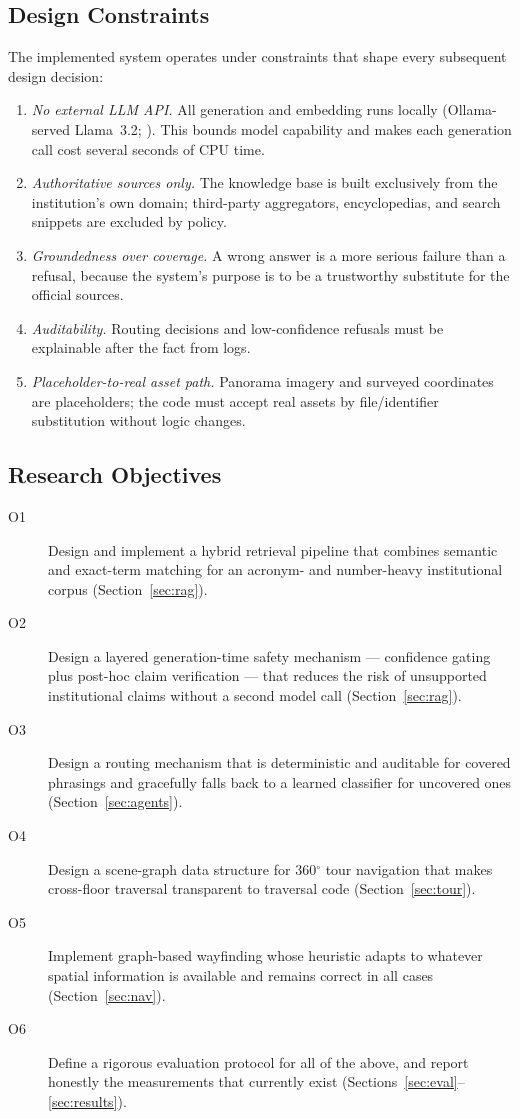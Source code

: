 \subsection{Design Constraints}
The implemented system operates under constraints that shape every
subsequent design decision:

\begin{enumerate}
\item \emph{No external LLM API.} All generation and embedding runs locally
(Ollama-served Llama~3.2; ). This bounds model
capability and makes each generation call cost several seconds of CPU time.
\item \emph{Authoritative sources only.} The knowledge base is built
exclusively from the institution's own domain; third-party aggregators,
encyclopedias, and search snippets are excluded by policy.
\item \emph{Groundedness over coverage.} A wrong answer is a more serious
failure than a refusal, because the system's purpose is to be a trustworthy
substitute for the official sources.
\item \emph{Auditability.} Routing decisions and low-confidence refusals
must be explainable after the fact from logs.
\item \emph{Placeholder-to-real asset path.} Panorama imagery and surveyed
coordinates are placeholders; the code must accept real assets by
file/identifier substitution without logic changes.
\end{enumerate}

\subsection{Research Objectives}
\begin{description}
\item[O1] Design and implement a hybrid retrieval pipeline that combines
semantic and exact-term matching for an acronym- and number-heavy
institutional corpus (Section~\ref{sec:rag}).
\item[O2] Design a layered generation-time safety mechanism --- confidence
gating plus post-hoc claim verification --- that reduces the risk of
unsupported institutional claims without a second model call
(Section~\ref{sec:rag}).
\item[O3] Design a routing mechanism that is deterministic and auditable
for covered phrasings and gracefully falls back to a learned classifier for
uncovered ones (Section~\ref{sec:agents}).
\item[O4] Design a scene-graph data structure for 360$^{\circ}$ tour
navigation that makes cross-floor traversal transparent to traversal code
(Section~\ref{sec:tour}).
\item[O5] Implement graph-based wayfinding whose heuristic adapts to
whatever spatial information is available and remains correct in all cases
(Section~\ref{sec:nav}).
\item[O6] Define a rigorous evaluation protocol for all of the above, and
report honestly the measurements that currently exist
(Sections~\ref{sec:eval}--\ref{sec:results}).
\end{description}

